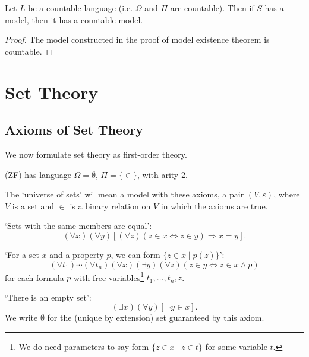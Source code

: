 \documentclass[a4paper, 10pt, twocolumn]{amsart}
\begin{document}
\begin{theorem}
  Let $L$ be a countable language (i.e. $\Omega$ and $\Pi$ are countable).
  Then if $S$ has a model, then it has a countable model.
\end{theorem}
\begin{proof}
  The model constructed in the proof of model existence theorem is countable.
\end{proof}


\section{Set Theory}

\subsection{Axioms of Set Theory}

We now formulate set theory as first-order theory.

\begin{definition}
   (ZF) has language $\Omega = \emptyset$, $\Pi = \{\in \}$, with arity 2.
\end{definition}

The `universe of sets' wil mean a model with these axioms, a pair $(V, \varepsilon)$, where $V$ is a set and $\in$ is a binary relation on $V$ in which the axioms are true. 

\begin{axiom}
  `Sets with the same members are equal':
  $$
  (\forall x)(\forall y)[(\forall z)(z \in x \Leftrightarrow z \in y) \Rightarrow x= y].
  $$
\end{axiom}

\begin{axiom}
`For a set $x$ and a property $p$, we can form $\{z \in x \mid p(z)\}$':
$$
(\forall t_1)\cdots (\forall t_n) (\forall x)(\exists y)(\forall z)(z \in y \Leftrightarrow z \in x \land p)
$$
for each formula $p$ with free variables\footnote{We do need parameters to say form $\{z \in x \mid z \in t\}$ for some variable $t$.} $t_1, \dots, t_n, z$.
\end{axiom}

\begin{axiom}
  `There is an empty set':
  $$
  (\exists x) (\forall y)[\lnot y \in x].
  $$
  We write $\emptyset$ for the (unique by extension) set guaranteed by this axiom.
\end{axiom}
\end{document}
